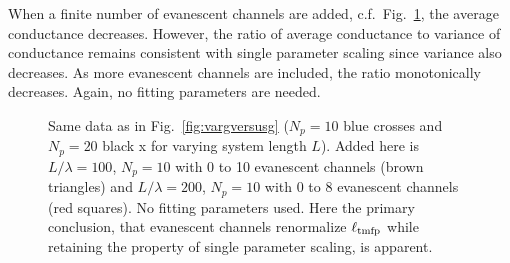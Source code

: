 When a finite number of evanescent channels are added, c.f.~Fig.~\ref{fig:vargversusgNCC}, the average conductance decreases. However, the ratio of average conductance to variance of conductance remains consistent with single parameter scaling %
since variance also decreases. As more evanescent channels are included, the ratio monotonically decreases. %
Again, no fitting parameters are needed.
\begin{figure}
\vskip -0.5cm
\centerline{
}
\vskip -0.5cm
\caption[Same data as in Fig.~\ref{fig:vargversusg} ($N_p=10$ blue crosses and $N_p=20$ black x for varying system length $L$).]{Same data as in Fig.~\ref{fig:vargversusg} ($N_p=10$ blue crosses and $N_p=20$ black x for varying system length $L$). Added here is $L/\lambda=100$, $N_p=10$ with 0 to 10 evanescent channels (brown triangles) and $L/\lambda=200$, $N_p=10$ with 0 to 8 evanescent channels (red squares). No fitting parameters used. Here the primary conclusion, that evanescent channels renormalize $\ell_{\rm tmfp}$ while retaining the property of single parameter scaling, is apparent. }
\label{fig:vargversusgNCC}
\end{figure}
